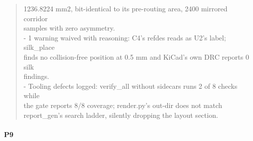 \documentclass[11pt,a4paper]{article}
\begin{document}
\begin{quote}
  1236.8224 mm2, bit-identical to its pre-routing area, 2400 mirrored corridor\\
  samples with zero asymmetry.\\
- 1 warning waived with reasoning: C4's refdes reads as U2's label; silk\_place\\
  finds no collision-free position at 0.5 mm and KiCad's own DRC reports 0 silk\\
  findings.\\
- Tooling defects logged: verify\_all without sidecars runs 2 of 8 checks while\\
  the gate reports 8/8 coverage; render.py's out-dir does not match\\
  report\_gen's search ladder, silently dropping the layout section.
\end{quote}
\paragraph*{P9}
\end{document}
